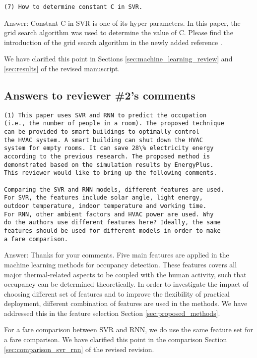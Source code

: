 \begin{verbatim}
(7) How to determine constant C in SVR.
\end{verbatim}
Answer: Constant C in SVR is one of its hyper parameters. In this paper, the grid search algorithm
was used to determine the value of C. Please find the introduction of the grid search algorithm in the
newly added reference \cite{Hsu2003}.

We have clarified this point in Sections \ref{sec:machine_learning_review} and \ref{sec:results} of the revised manuscript.

\subsection{Answers to reviewer \#2's comments}
\begin{verbatim}
(1) This paper uses SVR and RNN to predict the occupation
(i.e., the number of people in a room). The proposed technique
can be provided to smart buildings to optimally control
the HVAC system. A smart building can shut down the HVAC
system for empty rooms. It can save 28\% electricity energy
according to the previous research. The proposed method is
demonstrated based on the simulation results by EnergyPlus.
This reviewer would like to bring up the following comments.

Comparing the SVR and RNN models, different features are used.
For SVR, the features include solar angle, light energy,
outdoor temperature, indoor temperature and working time.
For RNN, other ambient factors and HVAC power are used. Why
do the authors use different features here? Ideally, the same
features should be used for different models in order to make
a fare comparison.
\end{verbatim}

Answer: Thanks for your comments. Five main features are applied in
the machine learning methods for occupancy detection.  These features
covers all major thermal-related aspects to be coupled with the human
activity, such that occupancy can be determined theoretically. In
order to investigate the impact of choosing different set of features
and to improve the flexibility of practical deployment, different
combination of features are used in the methods. We have addressed
this in the feature selection Section \ref{sec:proposed_methods}.

For a fare comparison between SVR and RNN, we do use the same feature
set for a fare comparison. We have clarified this point in the
comparison Section \ref{sec:comparison_svr_rnn} of the revised
revision.

